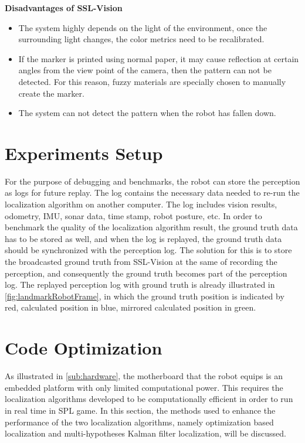 \noindent\textbf{Disadvantages of SSL-Vision}
\begin{itemize}
  \item The system highly depends on the light of the environment, once the surrounding light changes, the color metrics need to be recalibrated. 
  \item If the marker is printed using normal paper, it may cause reflection at certain angles from the view point of the camera, then the pattern can not be detected. For this reason, fuzzy materials are specially chosen to manually create the marker. 
  \item The system can not detect the pattern when the robot has fallen down.
\end{itemize}

\section{Experiments Setup}
\label{sub:Logging Perception and Ground Truth}
For the purpose of debugging and benchmarks, the robot can store the perception as logs for future replay. The log contains the necessary data needed to re-run the localization algorithm on another computer. The log includes vision results, odometry, \gls{IMU}, sonar data, time stamp, robot posture, etc. In order to benchmark the quality of the localization algorithm result, the ground truth data has to be stored as well, and when the log is replayed, the ground truth data should be synchronized with the perception log. The solution for this is to store the broadcasted ground truth from SSL-Vision at the same of recording the perception, and consequently the ground truth becomes part of the perception log. The replayed perception log with ground truth is already illustrated in \autoref{fig:landmarkRobotFrame}, in which the ground truth position is indicated by red, calculated position in blue, mirrored calculated position in green.






\section{Code Optimization}
\label{sec:Optimization}
As illustrated in \autoref{sub:hardware}, the motherboard that the robot equips is an embedded platform with only limited computational power. This requires the localization algorithms developed to be computationally efficient in order to run in real time in \gls{SPL} game. In this section, the methods used to enhance the performance of the two localization algorithms, namely optimization based localization and multi-hypotheses Kalman filter localization, will be discussed.

